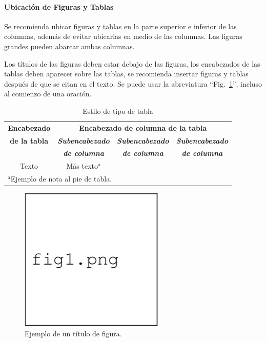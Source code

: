 \documentclass[letterpaper, 10pt, conference]{IEEEtran} %
\begin{document}
	\paragraph{Ubicación de Figuras y Tablas} Se recomienda ubicar figuras y tablas en la parte superior e inferior de las columnas, además de evitar ubicarlas en medio de las columnas. Las figuras grandes pueden abarcar ambas columnas.
	
	Los títulos de las figuras deben estar debajo de las figuras, los encabezados de las tablas deben aparecer sobre las tablas, se recomienda insertar figuras y tablas después de que se citan en el texto. Se puede usar la abreviatura ``Fig.~\ref{ejemploDeFigura}'', incluso al comienzo de una oración.
	
	\begin{table}[htbp]
		\caption{Estilo de tipo de tabla}
		\begin{center}
			\begin{tabular}{|c|c|c|c|}
				\hline
				\textbf{Encabezado} & \multicolumn{3}{|c|}{\textbf{Encabezado de columna de la tabla}} \\
				\cline{2-4}
				\textbf{de la tabla} & \textbf{\textit{Subencabezado}} & \textbf{\textit{Subencabezado}} & \textbf{\textit{Subencabezado}} \\
				& \textbf{\textit{de columna}} & \textbf{\textit{de columna}} & \textbf{\textit{de columna}} \\
				\hline
				Texto & Más texto$^{\mathrm{a}}$ & & \\
				\hline
				\multicolumn{4}{l}{$^{\mathrm{a}}$Ejemplo de nota al pie de tabla.}
			\end{tabular}
			\label{ejemploDeTabla}
		\end{center}
	\end{table}
	
	\begin{figure}[htbp]
		\centerline{\includegraphics{Figuras/Figura1.png}}
		\caption{Ejemplo de un título de figura.}
		\label{ejemploDeFigura}
	\end{figure}
	
\end{document}
